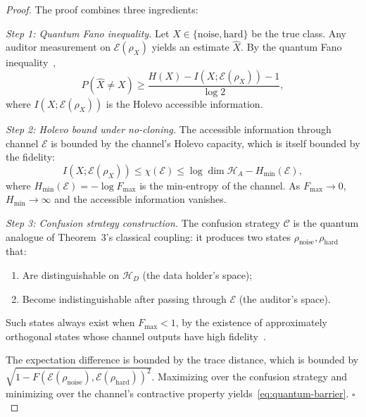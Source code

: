 \documentclass[12pt,a4paper]{article}
\newcommand{\cH}{\mathcal{H}}
\newcommand{\cE}{\mathcal{E}}
\newcommand{\cC}{\mathcal{C}}
\begin{document}
\begin{proof}
The proof combines three ingredients:

\textit{Step 1: Quantum Fano inequality.}
Let $X\in\{\mathrm{noise},\mathrm{hard}\}$ be the true class.  Any auditor
measurement on $\cE(\rho_X)$ yields an estimate $\hat{X}$.  By the quantum
Fano inequality~\citep{hayashi2017quantum},
\begin{equation}\label{eq:q-fano}
    P(\hat{X}\neq X) \geq
    \frac{H(X) - I(X;\cE(\rho_X)) - 1}{\log 2},
\end{equation}
where $I(X;\cE(\rho_X))$ is the Holevo accessible information.

\textit{Step 2: Holevo bound under no-cloning.}
The accessible information through channel $\cE$ is bounded by the channel's
Holevo capacity, which is itself bounded by the fidelity:
\begin{equation}\label{eq:holevo-fidelity}
    I(X;\cE(\rho_X)) \leq \chi(\cE) \leq
    \log\dim\cH_A - H_{\min}(\cE),
\end{equation}
where $H_{\min}(\cE) = -\log F_{\max}$ is the min-entropy of the channel.
As $F_{\max}\to0$, $H_{\min}\to\infty$ and the accessible information vanishes.

\textit{Step 3: Confusion strategy construction.}
The confusion strategy $\cC$ is the quantum analogue of Theorem~3's classical
coupling: it produces two states $\rho_{\mathrm{noise}},\rho_{\mathrm{hard}}$
that:
\begin{enumerate}[label=(\roman*)]
    \item Are distinguishable on $\cH_D$ (the data holder's space);
    \item Become indistinguishable after passing through $\cE$ (the auditor's
          space).
\end{enumerate}
Such states always exist when $F_{\max}<1$, by the existence of approximately
orthogonal states whose channel outputs have high fidelity~\citep{schumacher1996quantum}.

The expectation difference is bounded by the trace distance, which is bounded
by $\sqrt{1-F(\cE(\rho_{\mathrm{noise}}),\cE(\rho_{\mathrm{hard}}))^2}$.
Maximizing over the confusion strategy and minimizing over the channel's
contractive property yields~\eqref{eq:quantum-barrier}. $\square$
\end{proof}
\end{document}
